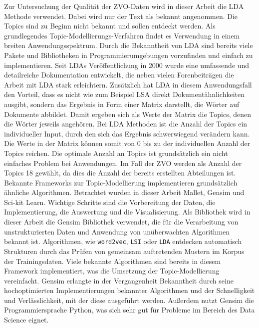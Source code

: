 \documentclass[german,version-2020-11]{uzl-thesis}
\begin{document}
Zur Untersuchung der Qualität der ZVO-Daten wird in dieser Arbeit die LDA Methode verwendet. Dabei wird nur der Text als bekannt angenommen. Die Topics sind zu Beginn nicht bekannt und sollen entdeckt werden. Als grundlegendes Topic-Modellierungs-Verfahren findet es Verwendung in einem breiten Anwendungsspektrum. Durch die Bekanntheit von LDA sind bereits viele Pakete und Bibliotheken in Programmierumgebungen vorzufinden und einfach zu implementieren. Seit LDAs Veröffentlichung in 2000 wurde eine umfassende und detailreiche Dokumentation entwickelt, die neben vielen Forenbeiträgen die Arbeit mit LDA stark erleichtern. Zusätzlich hat LDA in diesem Anwendungsfall den Vorteil, dass es nicht wie zum Beispiel LSA direkt Dokumentähnlichkeiten ausgibt, sondern das Ergebnis in Form einer Matrix darstellt, die Wörter auf Dokumente abbildet. Damit ergeben sich als Werte der Matrix die Topics, denen die Wörter jeweils angehören. Bei LDA Methoden ist die Anzahl der Topics ein individueller Input, durch den sich das Ergebnis schwerwiegend verändern kann. Die Werte in der Matrix können somit von $0$ bis zu der individuellen Anzahl der Topics reichen. Die optimale Anzahl an Topics ist grundsätzlich ein nicht einfaches Problem bei Anwendungen. Im Fall der ZVO werden als Anzahl der Topics 18  gewählt, da dies die Anzahl der bereits erstellten Abteilungen ist. \\

Bekannte Frameworks zur Topic-Modellierung implementieren grundsätzlich ähnliche Algorithmen. Betrachtet wurden in dieser Arbeit Mallet, Gensim und Sci-kit Learn.  Wichtige Schritte sind die Vorbereitung der Daten, die Implementierung, die Auswertung und die Visualisierung. Als Bibliothek wird in dieser Arbeit die Gensim Bibliothek verwendet, die für die Verarbeitung von unstrukturierten Daten und Anwendung von unüberwachten Algorithmen bekannt ist. Algorithmen, wie \lstinline{word2vec}, \lstinline{LSI} oder \lstinline{LDA} entdecken automatisch Strukturen durch das Prüfen von gemeinsam auftretenden Mustern im Korpus der Trainingsdaten. Viele bekannte Algorithmen sind bereits in diesem Framework implementiert, was die Umsetzung der Topic-Modellierung vereinfacht. Gensim erlangte in der Vergangenheit Bekanntheit durch seine hochoptimierten Implementierungen bekannter Algorithmen und der Schnelligkeit und Verlässlichkeit, mit der diese ausgeführt werden. Außerdem nutzt Gensim die Programmiersprache Python, was sich sehr gut für Probleme im Bereich des Data Science eignet. 
\end{document}
